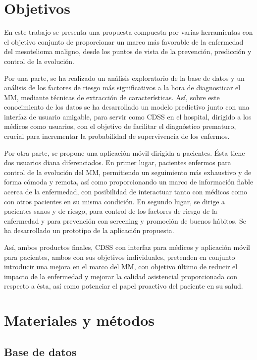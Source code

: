 \documentclass{article}
\begin{document}
\section{Objetivos}


En este trabajo se presenta una propuesta compuesta por varias
herramientas con el objetivo conjunto de proporcionar un marco más
favorable de la enfermedad del mesotelioma maligno, desde los puntos
de vista de la prevención, predicción y control de la evolución.

Por una parte, se ha realizado un análisis exploratorio de la base de
datos y un análisis de los factores de riesgo más significativos a la
hora de diagnosticar el MM, mediante técnicas de extracción de
características. Así, sobre este conocimiento de los datos se ha
desarrollado un modelo predictivo junto con una interfaz de usuario
amigable, para servir como CDSS en el hospital, dirigido a los médicos
como usuarios, con el objetivo de facilitar el diagnóstico prematuro,
crucial para incrementar la probabilidad de supervivencia de los
enfermos.

Por otra parte, se propone una aplicación móvil dirigida a pacientes.
Ésta tiene dos usuarios diana diferenciados. En primer lugar,
pacientes enfermos para control de la evolución del MM, permitiendo un
seguimiento más exhaustivo y de forma cómoda y remota, así como
proporcionando un marco de información fiable acerca de la enfermedad,
con posibilidad de interactuar tanto con médicos como con otros
pacientes en su misma condición. En segundo lugar, se dirige a
pacientes sanos y de riesgo, para control de los factores de riesgo de
la enfermedad y para prevención con screening y promoción de buenos
hábitos. Se ha desarrollado un prototipo de la aplicación propuesta.

Así, ambos productos finales, CDSS con interfaz para médicos y
aplicación móvil para pacientes, ambos con sus objetivos individuales,
pretenden en conjunto introducir una mejora en el marco del MM, con
objetivo último de reducir el impacto de la enfermedad y mejorar la
calidad asistencial proporcionada con respecto a ésta, así como
potenciar el papel proactivo del paciente en su salud.


\newpage
\section{Materiales y métodos}
\subsection{Base de datos}
\end{document}
